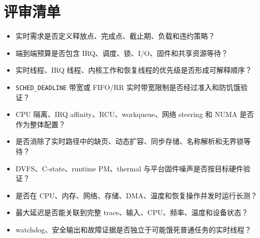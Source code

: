 \section{评审清单}

\begin{itemize}
  \item 实时需求是否定义释放点、完成点、截止期、负载和违约策略？
  \item 端到端预算是否包含 IRQ、调度、锁、I/O、固件和共享资源等待？
  \item 实时线程、IRQ 线程、内核工作和恢复线程的优先级是否形成可解释顺序？
  \item \texttt{SCHED\_DEADLINE} 带宽或 FIFO/RR 实时带宽限制是否经过准入和防饥饿验证？
  \item CPU 隔离、IRQ affinity、RCU、workqueue、网络 steering 和 NUMA 是否作为整体配置？
  \item 是否消除了实时路径中的缺页、动态扩容、同步存储、名称解析和无界锁等待？
  \item DVFS、C-state、runtime PM、thermal 与平台固件噪声是否按目标硬件验证？
  \item 是否在 CPU、内存、网络、存储、DMA、温度和恢复操作并发时运行长测？
  \item 最大延迟是否能关联到完整 trace、输入、CPU、频率、温度和设备状态？
  \item watchdog、安全输出和故障证据是否独立于可能饿死普通任务的实时线程？
\end{itemize}
